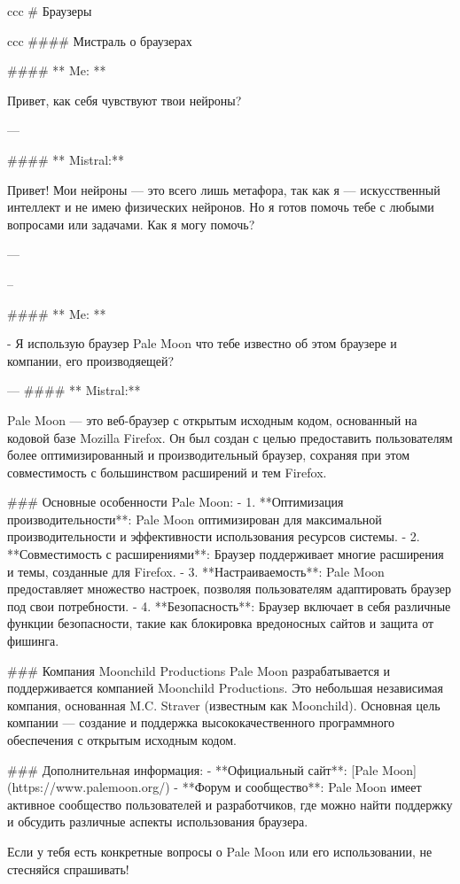 ccc  #  Браузеры


ccc  ####  Мистраль о браузерах



#### **  Me:  **

Привет, как себя чувствуют твои нейроны?

---

#### ** Mistral:**

Привет! Мои нейроны — это всего лишь метафора, так как я — искусственный интеллект и не имею физических нейронов. Но я готов помочь тебе с любыми вопросами или задачами. Как я могу помочь?

---

--

#### **  Me:  **

-
Я использую браузер Pale Moon   что тебе известно об этом браузере и компании, его производяещей?


---
#### ** Mistral:**

Pale Moon — это веб-браузер с открытым исходным кодом, основанный на кодовой базе Mozilla Firefox. Он был создан с целью предоставить пользователям более оптимизированный и производительный браузер, сохраняя при этом совместимость с большинством расширений и тем Firefox.

### Основные особенности Pale Moon:
-  1. **Оптимизация производительности**: Pale Moon оптимизирован для максимальной производительности и эффективности использования ресурсов системы.
-  2. **Совместимость с расширениями**: Браузер поддерживает многие расширения и темы, созданные для Firefox.
-  3. **Настраиваемость**: Pale Moon предоставляет множество настроек, позволяя пользователям адаптировать браузер под свои потребности.
-  4. **Безопасность**: Браузер включает в себя различные функции безопасности, такие как блокировка вредоносных сайтов и защита от фишинга.

### Компания Moonchild Productions
Pale Moon разрабатывается и поддерживается компанией Moonchild Productions. Это небольшая независимая компания, основанная M.C. Straver (известным как Moonchild). Основная цель компании — создание и поддержка высококачественного программного обеспечения с открытым исходным кодом.

### Дополнительная информация:
- **Официальный сайт**: [Pale Moon](https://www.palemoon.org/)
- **Форум и сообщество**: Pale Moon имеет активное сообщество пользователей и разработчиков, где можно найти поддержку и обсудить различные аспекты использования браузера.

Если у тебя есть конкретные вопросы о Pale Moon или его использовании, не стесняйся спрашивать!


